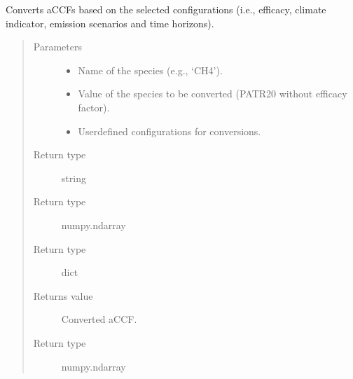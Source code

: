\documentclass[a4paper,11pt,english]{sphinxmanual}
\begin{document}
\label{\detokenize{modules:module-envlib.accf}}

\begin{fulllineitems}
\label{\detokenize{modules:envlib.accf.convert_accf}}
Converts aCCFs based on the selected configurations (i.e., efficacy, climate indicator, emission scenarios and time horizons).
\begin{quote}\begin{description}
\item[{Parameters}] \leavevmode\begin{itemize}
\item {} 
 \textendash{} Name of the species (e.g., ‘CH4’).

\item {} 
 \textendash{} Value of the species to be converted (P\sphinxhyphen{}ATR20 without efficacy factor).

\item {} 
 \textendash{} User\sphinxhyphen{}defined configurations for conversions.

\end{itemize}

\item[{Return type}] \leavevmode
string

\item[{Return type}] \leavevmode
numpy.ndarray

\item[{Return type}] \leavevmode
dict

\item[{Returns value}] \leavevmode
Converted aCCF.

\item[{Return type}] \leavevmode
numpy.ndarray

\end{description}\end{quote}

\end{fulllineitems}
\end{document}
